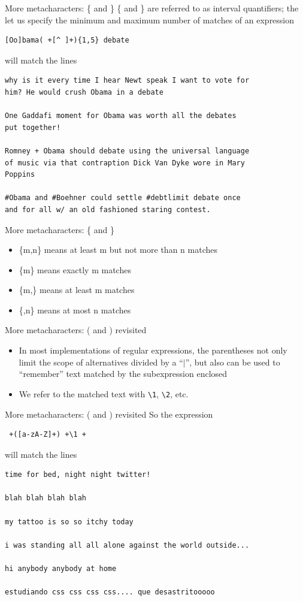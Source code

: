 \documentclass{beamer}
\begin{document}
\begin{frame}[fragile]{More metacharacters: \{ and \}}
\{ and \} are referred to as interval quantifiers; the let us specify
the minimum and maximum number of matches of an expression
\begin{verbatim}
[Oo]bama( +[^ ]+){1,5} debate
\end{verbatim}
will match the lines 
\begin{verbatim}
why is it every time I hear Newt speak I want to vote for 
him? He would crush Obama in a debate

One Gaddafi moment for Obama was worth all the debates 
put together!

Romney + Obama should debate using the universal language 
of music via that contraption Dick Van Dyke wore in Mary 
Poppins

#Obama and #Boehner could settle #debtlimit debate once 
and for all w/ an old fashioned staring contest.
\end{verbatim}
\end{frame}

\begin{frame}[fragile]{More metacharacters: \{ and \}}
\begin{itemize}
\item
\{m,n\} means at least m but not more than n matches
\item
\{m\} means exactly m matches
\item
\{m,\} means at least m matches
\item \{,n\} means at most n matches
\end{itemize}
\end{frame}

\begin{frame}[fragile]{More metacharacters: ( and ) revisited}
\begin{itemize}
\item
In most implementations of regular expressions, the parentheses not
only limit the scope of alternatives divided by a ``$|$'', but also
can be used to ``remember'' text matched by the subexpression enclosed
\item
We refer to the matched text with \verb+\1+, \verb+\2+, etc.
\end{itemize}
\end{frame}

\begin{frame}[fragile]{More metacharacters: ( and ) revisited}
So the expression 
\begin{verbatim}
 +([a-zA-Z]+) +\1 +
\end{verbatim}
will match the lines 
\begin{verbatim}
time for bed, night night twitter!

blah blah blah blah 

my tattoo is so so itchy today

i was standing all all alone against the world outside...

hi anybody anybody at home

estudiando css css css css.... que desastritooooo
\end{verbatim}
\end{frame}
\end{document}

